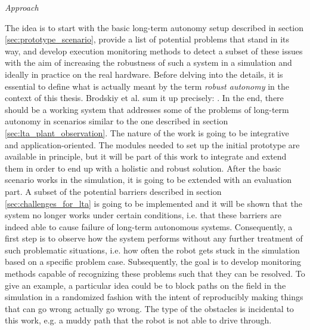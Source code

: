 \documentclass[english, master, utf8]{base/thesis_KBS}
\begin{document}
\noindent
\textit{Approach}\newline

\noindent
The idea is to start with the basic long-term autonomy setup described in section \ref{sec:prototype_scenario}, provide a list of potential problems that 
stand in its way, and develop execution monitoring methods to detect a subset of these issues with the aim of increasing the robustness of such a system in a simulation
and ideally in practice on the real hardware. Before delving into the details, it is essential to define what is actually meant by the term \textit{robust autonomy} in the
context of this thesis. Brodskiy et al. sum it up precisely: . \cite{Brodskiy:2011}
In the end, there should be a working system that addresses some of the problems of long-term autonomy
in scenarios similar to the one described in section \ref{sec:lta_plant_observation}. The nature of the work is going to be integrative and application-oriented. The modules 
needed to set up the initial prototype are available in principle, but it will be part of this work to integrate and extend them in order to end up with a holistic and robust
solution. After the basic scenario works in the simulation, it is going to be extended with an evaluation part. A subset of the potential barriers described in section 
\ref{sec:challenges_for_lta} is going to be implemented and it will be shown that the system no longer works under certain conditions, i.e. that these
barriers are indeed able to cause failure of long-term autonomous systems. Consequently, a first step is to observe how the system performs without any further 
treatment of such problematic situations, i.e. how often the robot gets stuck in the simulation based on a specific problem case.
Subsequently, the goal is to develop monitoring methods capable of recognizing these problems such that they can be resolved.
To give an example, a particular idea could be to block paths on the field in the simulation in a randomized fashion with the intent of reproducibly making things that 
can go wrong actually go wrong. The type of the obstacles is incidental to this work, e.g. a muddy path that the robot is not able to drive through. 
\end{document}
